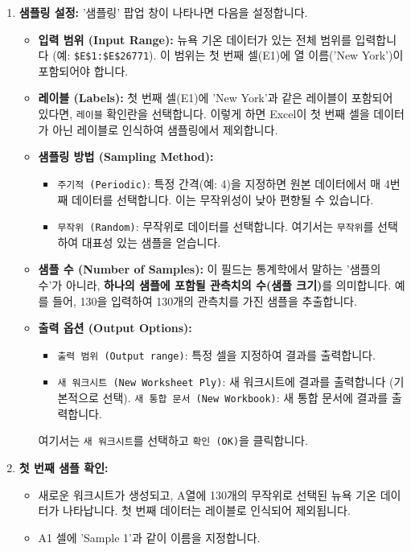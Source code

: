 \documentclass[11pt,a4paper]{book}
\newcommand{\excel}[1]{\texttt{#1}}
\theoremstyle{definition}
\begin{document}
\begin{enumerate}
    \item \textbf{샘플링 설정:}
    '샘플링' 팝업 창이 나타나면 다음을 설정합니다.
    \begin{itemize}
        \item \textbf{입력 범위 (Input Range):} 뉴욕 기온 데이터가 있는 전체 범위를 입력합니다 (예: \excel{\$E\$1:\$E\$26771}). 이 범위는 첫 번째 셀(E1)에 열 이름('New York')이 포함되어야 합니다.
        \item \textbf{레이블 (Labels):} 첫 번째 셀(E1)에 'New York'과 같은 레이블이 포함되어 있다면, \excel{레이블} 확인란을 선택합니다. 이렇게 하면 Excel이 첫 번째 셀을 데이터가 아닌 레이블로 인식하여 샘플링에서 제외합니다.
        \item \textbf{샘플링 방법 (Sampling Method):}
        \begin{itemize}
            \item \excel{주기적 (Periodic)}: 특정 간격(예: 4)을 지정하면 원본 데이터에서 매 4번째 데이터를 선택합니다. 이는 무작위성이 낮아 편향될 수 있습니다.
            \item \excel{무작위 (Random)}: 무작위로 데이터를 선택합니다. 여기서는 \excel{무작위}를 선택하여 대표성 있는 샘플을 얻습니다.
        \end{itemize}
        \item \textbf{샘플 수 (Number of Samples):} 이 필드는 통계학에서 말하는 '샘플의 수'가 아니라, \textbf{하나의 샘플에 포함될 관측치의 수(샘플 크기)}를 의미합니다. 예를 들어, 130을 입력하여 130개의 관측치를 가진 샘플을 추출합니다.
        \item \textbf{출력 옵션 (Output Options):}
        \begin{itemize}
            \item \excel{출력 범위 (Output range)}: 특정 셀을 지정하여 결과를 출력합니다.
            \item \excel{새 워크시트 (New Worksheet Ply)}: 새 워크시트에 결과를 출력합니다 (기본적으로 선택).
            \excel{새 통합 문서 (New Workbook)}: 새 통합 문서에 결과를 출력합니다.
        \end{itemize}
        여기서는 \excel{새 워크시트}를 선택하고 \excel{확인 (OK)}을 클릭합니다.
    \end{itemize}

    \item \textbf{첫 번째 샘플 확인:}
    \begin{itemize}
        \item 새로운 워크시트가 생성되고, A열에 130개의 무작위로 선택된 뉴욕 기온 데이터가 나타납니다. 첫 번째 데이터는 레이블로 인식되어 제외됩니다.
        \item A1 셀에 'Sample 1'과 같이 이름을 지정합니다.
    \end{itemize}


\end{enumerate}
\end{document}

